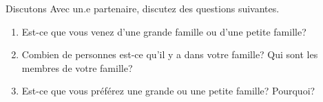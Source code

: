 \begin{frame}{Discutons}
  Avec un.e partenaire, discutez des questions suivantes.
  \begin{enumerate}
    \item Est-ce que vous venez d'une grande famille ou d'une petite famille? 
    \item Combien de personnes est-ce qu'il y a dans votre famille? Qui sont les membres de votre famille?
    \item Est-ce que vous préférez une grande ou une petite famille? Pourquoi?
  \end{enumerate}
\end{frame}